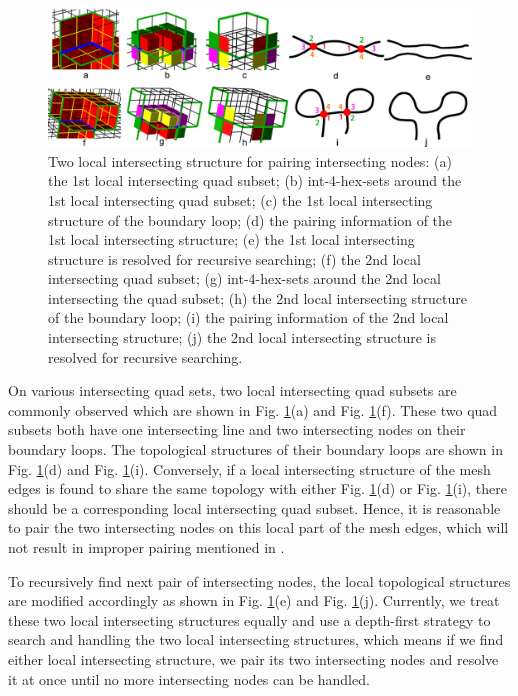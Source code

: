 \documentclass[final,5p,times,twocolumn]{elsarticle}
\begin{document}
\begin{figure}[htbp]
\begin{center}
\includegraphics[width=17cm]{figures/pair_patterns.png}
\caption{Two local intersecting structure for pairing intersecting nodes: (a) the 1st local intersecting quad subset; (b) int-4-hex-sets around the 1st local intersecting quad subset; (c) the 1st local intersecting structure of the boundary loop; (d) the pairing information of the 1st local intersecting structure; (e) the 1st local intersecting structure is resolved for recursive searching; (f) the 2nd local intersecting quad subset; (g) int-4-hex-sets around the 2nd local intersecting the quad subset; (h) the 2nd local intersecting structure of the boundary loop; (i) the pairing information of the 2nd local intersecting structure; (j) the 2nd local intersecting structure is resolved for recursive searching.}
\label{fig:int_pair_tpl}
\end{center}
\end{figure}

On various intersecting quad sets, two local intersecting quad subsets are commonly observed which are shown in Fig. \ref{fig:int_pair_tpl}(a) and Fig. \ref{fig:int_pair_tpl}(f). These two quad subsets both have one intersecting line and two intersecting nodes on their boundary loops. The topological structures of their boundary loops are shown in Fig. \ref{fig:int_pair_tpl}(d) and Fig. \ref{fig:int_pair_tpl}(i). Conversely, if a local intersecting structure of the mesh edges is found to share the same topology with either Fig. \ref{fig:int_pair_tpl}(d) or Fig. \ref{fig:int_pair_tpl}(i), there should be a corresponding local intersecting quad subset. Hence, it is reasonable to pair the two intersecting nodes on this local part of the mesh edges, which will not result in improper pairing mentioned in \cite{Suzuki:2010hn}.

To recursively find next pair of intersecting nodes, the local topological structures are modified accordingly as shown in Fig. \ref{fig:int_pair_tpl}(e) and Fig. \ref{fig:int_pair_tpl}(j). Currently, we treat these two local intersecting structures equally and use a depth-first strategy to search and handling the two local intersecting structures, which means if we find either local intersecting structure, we pair its two intersecting nodes and resolve it at once until no more intersecting nodes can be handled.
\end{document}
